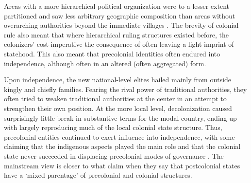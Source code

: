 Areas with a more hierarchical political organization were to a lesser extent
partitioned and saw less arbitrary geographic composition than areas without
overarching authorities beyond the immediate villages \citep{Green2012,
Nugent1996}. The brevity of colonial rule also meant that where hierarchical
ruling structures existed before, the colonizers' cost-imperative the
consequence of often leaving a light imprint of statehood. This also meant that
precolonial identities often endured into independence, although often in an
altered (often aggregated) form. 



Upon independence, the new national-level elites hailed mainly from outside
kingly and chiefly families. Fearing the rival power of traditional authorities,
they often tried to weaken traditional authorities at the center in an attempt
to strengthen their own position. At the more local level, decolonization caused
surprisingly little break in substantive terms for the modal country, ending up
with largely reproducing much of the local colonial state structure. Thus,
precolonial entities continued to exert influence into independence, with some
claiming that the indigenous aspects played the main role and that the
colonial state never succeeded in displacing precolonial modes of governance
\citep{ChabalPatrick1999Aw:d}. The mainstream view is closer to what
\citet[22]{englebert2013inside} claim when they say that postcolonial states
have a `mixed parentage' of precolonial and colonial structures.

